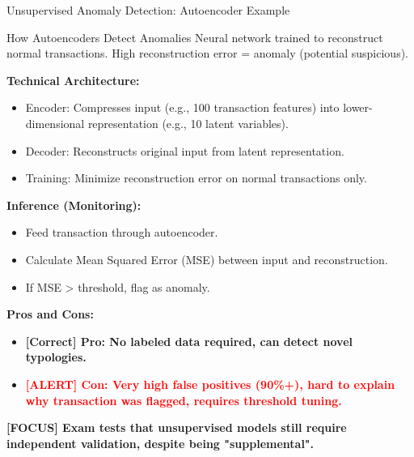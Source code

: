 \documentclass[11pt,a4paper]{beamer}
\newcommand{\redflag}[1]{\textcolor{red}{\textbf{[ALERT] #1}}}
\newcommand{\greennote}[1]{\textcolor{green!50!black}{\textbf{[Correct] #1}}}
\newcommand{\examfocus}[1]{\textcolor{orange!80!black}{\textbf{[FOCUS] #1}}}
\begin{document}
\begin{frame}{Unsupervised Anomaly Detection: Autoencoder Example}
	\begin{block}{How Autoencoders Detect Anomalies}
		Neural network trained to reconstruct normal transactions. High reconstruction error = anomaly (potential suspicious).
	\end{block}
	\textbf{Technical Architecture:}
	\begin{itemize}
		\item Encoder: Compresses input (e.g., 100 transaction features) into lower-dimensional representation (e.g., 10 latent variables).
		\item Decoder: Reconstructs original input from latent representation.
		\item Training: Minimize reconstruction error on normal transactions only.
	\end{itemize}
	\textbf{Inference (Monitoring):}
	\begin{itemize}
		\item Feed transaction through autoencoder.
		\item Calculate Mean Squared Error (MSE) between input and reconstruction.
		\item If MSE > threshold, flag as anomaly.
	\end{itemize}
	\textbf{Pros and Cons:}
\begin{itemize}
	\item \greennote{Pro: No labeled data required, can detect novel typologies.}
	\item \redflag{Con: Very high false positives (90\%+), hard to explain why transaction was flagged, requires threshold tuning.}
\end{itemize}
	\examfocus{Exam tests that unsupervised models still require independent validation, despite being "supplemental".}
\end{frame}
\end{document}
